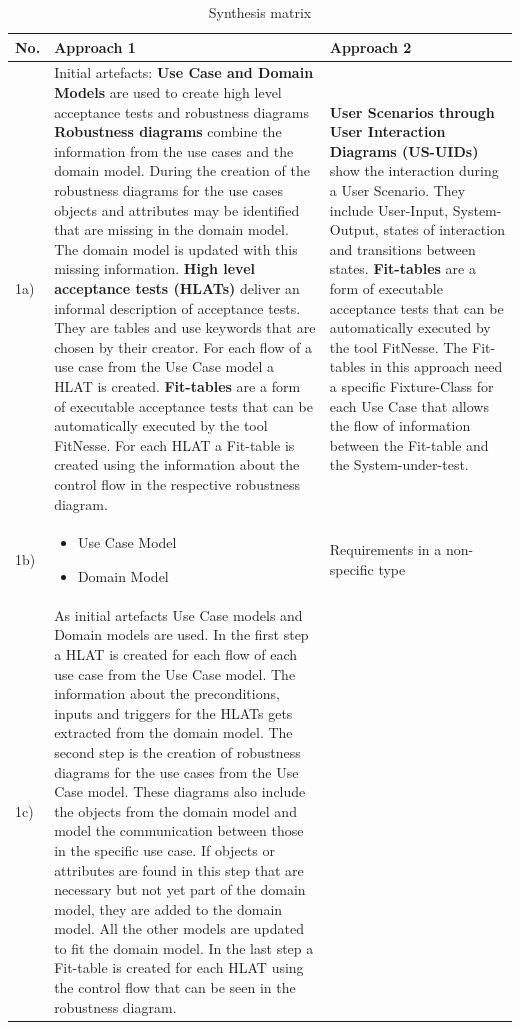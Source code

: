 \begin{small} 		
\begin{longtable}[h]{p{0.45cm}|p{}|p{}}
	\caption{Synthesis matrix}
	\label{tab:blub}
	\\    %
	\hline
  	\textbf{No.} & \textbf{Approach 1} & \textbf{Approach 2}\\
  	\hline
  		 1a) & Initial artefacts: \textbf{Use Case and Domain Models} are used to create high level acceptance tests and robustness diagrams 
\textbf{Robustness diagrams} combine the information from the use cases and the domain model. During the creation of the robustness diagrams for the use cases objects and attributes may be identified that are missing in the domain model. The domain model is updated with this missing information.
\textbf{High level acceptance tests (HLATs)} deliver an informal description of acceptance tests. They are tables and use keywords that are chosen by their creator. For each flow of a use case from the Use Case model a HLAT is created.
\textbf{Fit-tables} are a form of executable acceptance tests that can be automatically executed by the tool FitNesse. For each HLAT a Fit-table is created using the information about the control flow in the respective robustness diagram.
 & \textbf{User Scenarios through User Interaction Diagrams (US-UIDs)} show the interaction during a User Scenario. They include User-Input, System-Output, states of interaction and transitions between states.
\textbf{Fit-tables} are a form of executable acceptance tests that can be automatically executed by the tool FitNesse. The Fit-tables in this approach need a specific Fixture-Class for each Use Case that allows the flow of information between the Fit-table and the System-under-test.
 \\
 \hline
  1b) & \begin{itemize}
  		 \item Use Case Model \item Domain Model
\end{itemize}  		  & Requirements in a non-specific type \\
	\hline
  1c) & As initial artefacts Use Case models and Domain models are used.
In the first step a HLAT is created for each flow of each use case from the Use Case model. The information about the preconditions, inputs and triggers for the HLATs gets extracted from the domain model.
The second step is the creation of robustness diagrams for the use cases from the Use Case model. These diagrams also include the objects from the domain model and model the communication between those in the specific use case. If objects or attributes are found in this step that are necessary but not yet part of the domain model, they are added to the domain model. All the other models are updated to fit the domain model. In the last step a Fit-table is created for each HLAT using the control flow that can be seen in the robustness diagram. 

\end{longtable}
\end{small}
